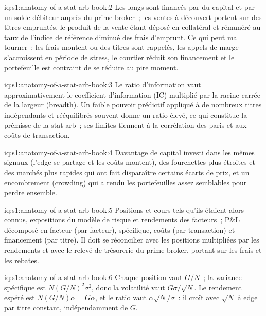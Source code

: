 \begin{solution}{iq:s1:anatomy-of-a-stat-arb-book:2}
Les longs sont financés par du capital et par un solde débiteur auprès du prime broker~; les ventes à découvert portent sur des titres empruntés, le produit de la vente étant déposé en collatéral et rémunéré au taux de l'indice de référence diminué des
frais d'emprunt. Ce qui peut mal tourner~: les frais montent ou des titres sont rappelés, les appels de marge s'accroissent en période de stress, le courtier réduit son financement et le portefeuille est contraint de se réduire au pire
moment.
\end{solution}

\begin{solution}{iq:s1:anatomy-of-a-stat-arb-book:3}
Le ratio d'information vaut approximativement le coefficient d'information (IC) multiplié par la racine carrée de la largeur (breadth). Un faible pouvoir prédictif appliqué à de nombreux
titres indépendants et rééquilibrés souvent donne un ratio élevé, ce qui constitue la prémisse de la stat arb~; ses limites tiennent à la corrélation des paris et aux coûts de transaction.
\end{solution}

\begin{solution}{iq:s1:anatomy-of-a-stat-arb-book:4}
Davantage de capital investi dans les mêmes signaux (l'edge se partage et les coûts montent), des fourchettes plus étroites et des marchés plus rapides qui ont fait disparaître certains écarts de prix, et un encombrement (crowding) qui
a rendu les portefeuilles assez semblables pour perdre ensemble.
\end{solution}

\begin{solution}{iq:s1:anatomy-of-a-stat-arb-book:5}
Positions et cours tels qu'ils étaient alors connus, expositions du modèle de risque et rendements des facteurs~; P\&L décomposé en facteur (par facteur), spécifique, coûts (par transaction) et financement (par
titre). Il doit se réconcilier avec les positions multipliées par les rendements et avec le relevé de trésorerie du prime broker, portant sur les frais et les rebates.
\end{solution}

\begin{solution}{iq:s1:anatomy-of-a-stat-arb-book:6}
Chaque position vaut $G/N$~; la variance spécifique est $N (G/N)^2 \sigma^2$, donc la volatilité vaut $G\sigma/\sqrt N$. Le rendement espéré est $N (G/N)\alpha = G\alpha$,
et le ratio vaut $\alpha\sqrt N/\sigma$~: il croît avec $\sqrt N$ à edge par titre constant, indépendamment de $G$.
\end{solution}
